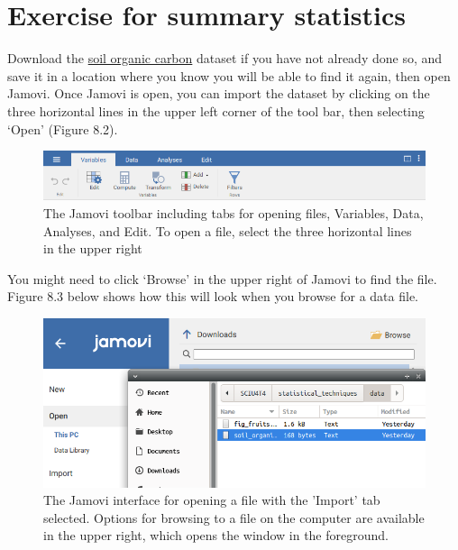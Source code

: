 \documentclass[
]{scrbook}
\begin{document}
\hypertarget{summary_statistics_02}{%
\section{Exercise for summary statistics}\label{summary_statistics_02}}

Download the \href{https://raw.githubusercontent.com/bradduthie/statistical_techniques/main/data/soil_organic_carbon.csv}{soil organic carbon} dataset if you have not already done so, and save it in a location where you know you will be able to find it again, then open Jamovi.
Once Jamovi is open, you can import the dataset by clicking on the three horizontal lines in the upper left corner of the tool bar, then selecting `Open' (Figure 8.2).

\begin{figure}
\includegraphics[width=1\linewidth]{img/jamovi_toolbar} \caption{The Jamovi toolbar including tabs for opening files, Variables, Data, Analyses, and Edit. To open a file, select the three horizontal lines in the upper right}\label{fig:unnamed-chunk-22}
\end{figure}

You might need to click `Browse' in the upper right of Jamovi to find the file.
Figure 8.3 below shows how this will look when you browse for a data file.

\begin{figure}
\includegraphics[width=1\linewidth]{img/open_soil_organic_carbon} \caption{The Jamovi interface for opening a file with the 'Import' tab selected. Options for browsing to a file on the computer are available in the upper right, which opens the window in the foreground.}\label{fig:unnamed-chunk-23}
\end{figure}
\end{document}

